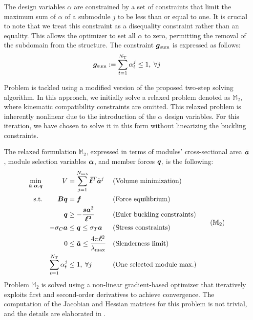 The design variables $\alpha$ are constrained by a set of constraints that limit the maximum sum of $\alpha$ of a submodule $j$ to be less than or equal to one. It is crucial to note that we treat this constraint as a disequality constraint rather than an equality. This allows the optimizer to set all $\alpha$ to zero, permitting the removal of the subdomain from the structure. The constraint $\bm{g}_\text{sum}$ is expressed as follows:
\begin{equation}
    \bm{g}_\text{sum}:=\sum_{t=1}^{N_\text{T}} \alpha_t^j \leq 1, \; \forall j 
\end{equation}

Problem  is tackled using a modified version of the proposed two-step solving algorithm. In this approach, we initially solve a relaxed problem denoted as $\mathbb{M}_2$, where kinematic compatibility constraints are omitted. This relaxed problem is inherently nonlinear due to the introduction of the $\alpha$ design variables. For this iteration, we have chosen to solve it in this form without linearizing the buckling constraints.

The relaxed formulation $\mathbb{M}_2$, expressed in terms of modules' cross-sectional area $\bar{\bm{a}}$, module selection variables $\bm{\alpha}$, and member forces $\bm{q}$, is the following:
\begin{equation}
    \begin{aligned}
    \min_{\bar{\vect{a}}, \vect{\alpha}, \bm{q}}   && V &= \sum_{j=1}^{N_{\text{sub}}}\vect{\bar{\ell}}^T\tilde{\vect{a}}^j && \textrm{(Volume minimization)}\\
    \textrm{s.t.}   && \bm{B}\bm{q} &= \bm{f} && \textrm{(Force equilibrium)}\\
                    && \bm{q} &\geq -\frac{\bm{s}\bm{a}^2}{\bm{\ell^2}} && \textrm{(Euler buckling constraints)} \\
                    && -\sigma_C\bm{a} &\leq \bm{q} \leq \sigma_T\bm{a} && \textrm{(Stress constraints)} \\
                    && 0 &\leq \bar{\vect{a}} \leq \frac{4 \pi \bar{\vect{\ell}}^2}{\lambda_{\text{max}}} && \textrm{(Slenderness limit)} \\
                    && \sum_{t=1}^{N_\text{T}} \alpha_t^j &\leq 1, \; \forall j && \textrm{(One selected module max.)} \\
    \end{aligned}
    \tag{$\mathbb{M}_2$}
    \label{eq:06_optim_relax}
\end{equation}
Problem $\mathbb{M}_2$ is solved using a non-linear gradient-based optimizer that iteratively exploits first and second-order derivatives to achieve convergence. The computation of the Jacobian and Hessian matrices for this problem is not trivial, and the details are elaborated in .

